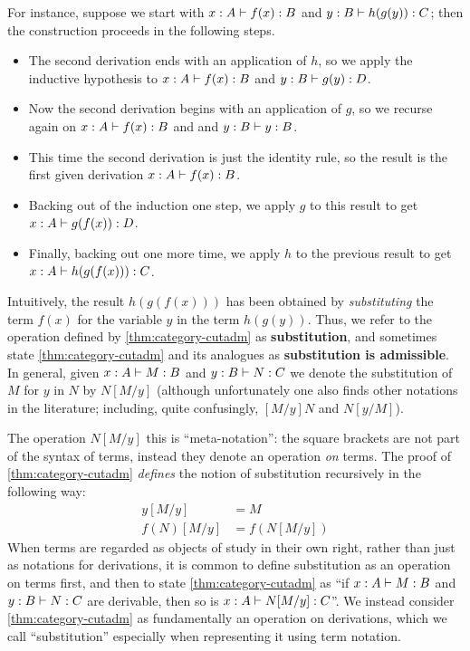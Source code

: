 For instance, suppose we start with $x:A \vdash f(x):B$ and $y:B\vdash h(g(y)):C$; then the construction proceeds in the following steps.
\begin{itemize}
\item The second derivation ends with an application of $h$, so we apply the inductive hypothesis to $x:A \vdash f(x):B$ and $y:B\vdash g(y):D$.
\item Now the second derivation begins with an application of $g$, so we recurse again on $x:A \vdash f(x):B$ and and $y:B\vdash y:B$.
\item This time the second derivation is just the identity rule, so the result is the first given derivation $x:A \vdash f(x):B$.
\item Backing out of the induction one step, we apply $g$ to this result to get $x:A\vdash g(f(x)):D$.
\item Finally, backing out one more time, we apply $h$ to the previous result to get $x:A\vdash h(g(f(x))):C$.
\end{itemize}
Intuitively, the result $h(g(f(x)))$ has been obtained by \emph{substituting} the term $f(x)$ for the variable $y$ in the term $h(g(y))$.
Thus, we refer to the operation defined by \cref{thm:category-cutadm} as \textbf{substitution}, and sometimes state \cref{thm:category-cutadm} and its analogues as \textbf{substitution is admissible}.
In general, given $x:A\vdash M:B$ and $y:B\vdash N:C$ we denote the substitution of $M$ for $y$ in $N$ by $N[M/y]$ (although unfortunately one also finds other notations in the literature; including, quite confusingly, $[M/y]N$ and $N[y/M]$).

The operation $N[M/y]$ this is ``meta-notation'': the square brackets are not part of the syntax of terms, instead they denote an operation \emph{on} terms.
The proof of \cref{thm:category-cutadm} \emph{defines} the notion of substitution recursively in the following way:
\begin{align}
  y[M/y] &= M\label{eq:category-sub-1}\\
  f(N)[M/y] &= f(N[M/y])\label{eq:category-sub-2}
\end{align}
When terms are regarded as objects of study in their own right, rather than just as notations for derivations, it is common to define substitution as an operation on terms first, and then to state \cref{thm:category-cutadm} as ``if $x:A\vdash M:B$ and $y:B\vdash N:C$ are derivable, then so is $x:A\vdash N[M/y]:C$''.
We instead consider \cref{thm:category-cutadm} as fundamentally an operation on derivations, which we call ``substitution'' especially when representing it using term notation.

